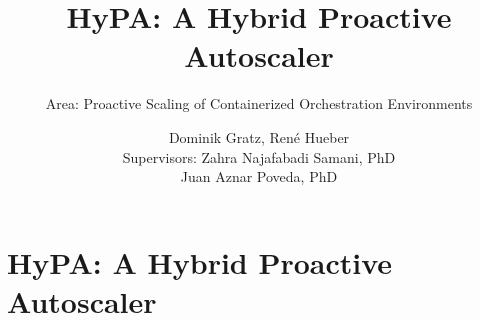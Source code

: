 \documentclass[11pt,t,usepdftitle=false,aspectratio=169]{beamer}
\title[HyPA]{HyPA: A Hybrid Proactive Autoscaler}
\subtitle{Area: Proactive Scaling of Containerized Orchestration Environments}
\author[Dominik Gratz \& René Hueber]{Dominik Gratz, René Hueber\\[3mm]{\small Supervisors: Zahra Najafabadi Samani, PhD \\ \hspace{20mm} Juan Aznar Poveda, PhD}}
\begin{document}



\section{HyPA: A Hybrid Proactive Autoscaler}


\end{document}
